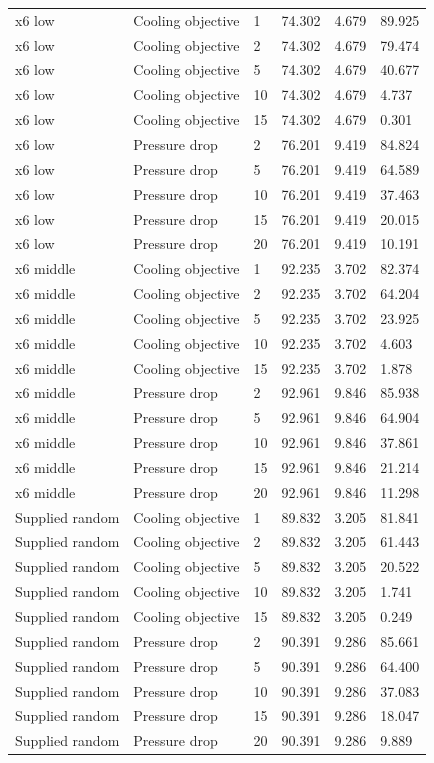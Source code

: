 \begin{longtable}{llllll}
x6 low & Cooling objective & 1 & 74.302 & 4.679 & 89.925\\
x6 low & Cooling objective & 2 & 74.302 & 4.679 & 79.474\\
x6 low & Cooling objective & 5 & 74.302 & 4.679 & 40.677\\
x6 low & Cooling objective & 10 & 74.302 & 4.679 & 4.737\\
x6 low & Cooling objective & 15 & 74.302 & 4.679 & 0.301\\
x6 low & Pressure drop & 2 & 76.201 & 9.419 & 84.824\\
x6 low & Pressure drop & 5 & 76.201 & 9.419 & 64.589\\
x6 low & Pressure drop & 10 & 76.201 & 9.419 & 37.463\\
x6 low & Pressure drop & 15 & 76.201 & 9.419 & 20.015\\
x6 low & Pressure drop & 20 & 76.201 & 9.419 & 10.191\\
x6 middle & Cooling objective & 1 & 92.235 & 3.702 & 82.374\\
x6 middle & Cooling objective & 2 & 92.235 & 3.702 & 64.204\\
x6 middle & Cooling objective & 5 & 92.235 & 3.702 & 23.925\\
x6 middle & Cooling objective & 10 & 92.235 & 3.702 & 4.603\\
x6 middle & Cooling objective & 15 & 92.235 & 3.702 & 1.878\\
x6 middle & Pressure drop & 2 & 92.961 & 9.846 & 85.938\\
x6 middle & Pressure drop & 5 & 92.961 & 9.846 & 64.904\\
x6 middle & Pressure drop & 10 & 92.961 & 9.846 & 37.861\\
x6 middle & Pressure drop & 15 & 92.961 & 9.846 & 21.214\\
x6 middle & Pressure drop & 20 & 92.961 & 9.846 & 11.298\\
Supplied random & Cooling objective & 1 & 89.832 & 3.205 & 81.841\\
Supplied random & Cooling objective & 2 & 89.832 & 3.205 & 61.443\\
Supplied random & Cooling objective & 5 & 89.832 & 3.205 & 20.522\\
Supplied random & Cooling objective & 10 & 89.832 & 3.205 & 1.741\\
Supplied random & Cooling objective & 15 & 89.832 & 3.205 & 0.249\\
Supplied random & Pressure drop & 2 & 90.391 & 9.286 & 85.661\\
Supplied random & Pressure drop & 5 & 90.391 & 9.286 & 64.400\\
Supplied random & Pressure drop & 10 & 90.391 & 9.286 & 37.083\\
Supplied random & Pressure drop & 15 & 90.391 & 9.286 & 18.047\\
Supplied random & Pressure drop & 20 & 90.391 & 9.286 & 9.889\\
\bottomrule\end{longtable}\endgroup
